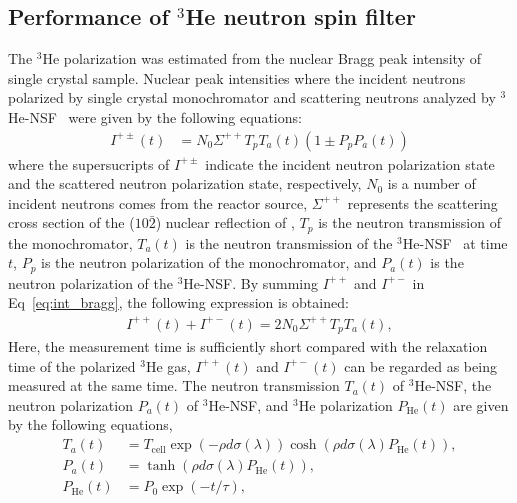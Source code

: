 \documentclass[%
 reprint,
superscriptaddress,
 amsmath,amssymb,
 aps,
]{revtex4-2}
\newcommand{\He}{$^3$He }
\newcommand{\Hensf}{$^3$He-NSF}
\begin{document}
\subsection{Performance of \He neutron spin filter}
The \He polarization was estimated from the nuclear Bragg peak intensity of  single crystal sample.
Nuclear peak intensities where the incident neutrons polarized by  single crystal monochromator and scattering neutrons analyzed by \Hensf~ were given by the following equations:
\begin{align}
    I^{+\pm}(t) &= N_0 \Sigma^{++}T_pT_a(t)(1\pm P_pP_a(t))
    \label{eq:int_bragg}
\end{align}
where the supersucripts of $I^{+\pm}$ indicate the incident neutron polarization state and the scattered neutron polarization state, respectively,
$N_0$ is a number of incident neutrons comes from the reactor source, $\Sigma^{++}$ represents the scattering cross section of the ($10\bar{2}$) nuclear reflection of ,
$T_p$ is the neutron transmission of the  monochromator, $T_a(t)$ is the neutron transmission of the \Hensf~ at time $t$,
$P_p$ is the neutron polarization of the  monochromator, and $P_a(t)$ is the neutron polarization of the \Hensf.
By summing $I^{++}$ and $I^{+-}$ in Eq~\ref{eq:int_bragg}, the following expression is obtained:
\begin{align}
    I^{++}(t)+I^{+-}(t) = 2N_0 \Sigma^{++}T_pT_a(t),
    \label{eq:transmission}
\end{align}
Here, the measurement time is sufficiently short compared with the relaxation time of the polarized \He gas, $I^{++}(t)$ and $I^{+-}(t)$ can be regarded as being measured at the same time.
The neutron transmission $T_a(t)$ of \Hensf, the neutron polarization $P_a(t)$ of \Hensf, and \He polarization $P_\mathrm{He}(t)$ are given by the following equations,
\begin{align}
    T_a(t) &= T_\mathrm{cell}\exp(-\rho d \sigma(\lambda))\cosh(\rho d \sigma(\lambda)P_\mathrm{He}(t)),\\
    P_a(t) &= \tanh(\rho d \sigma(\lambda)P_\mathrm{He}(t)),\\
    P_\mathrm{He}(t) &= P_0 \exp(-t/\tau),
    \label{eq:transmission_3He}
\end{align}
\end{document}
